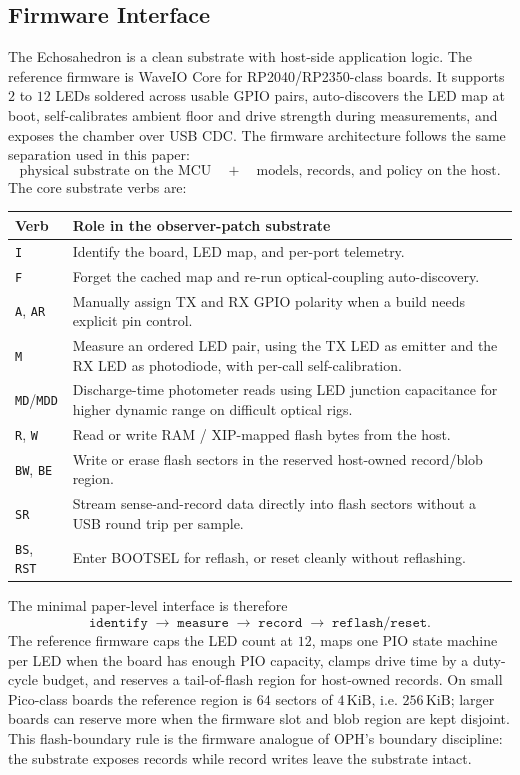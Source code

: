 \documentclass[11pt]{article}
\theoremstyle{remark}
\theoremstyle{plain}
\begin{document}
\subsection{Firmware Interface}

The Echosahedron is a clean substrate with host-side application logic. The reference firmware is WaveIO Core for RP2040/RP2350-class boards. It supports \(2\) to \(12\) LEDs soldered across usable GPIO pairs, auto-discovers the LED map at boot, self-calibrates ambient floor and drive strength during measurements, and exposes the chamber over USB CDC. The firmware architecture follows the same separation used in this paper:
\[
\boxed{
\text{physical substrate on the MCU}
\quad+\quad
\text{models, records, and policy on the host}.
}
\]
The core substrate verbs are:

\begin{longtable}{L{0.20\textwidth}L{0.70\textwidth}}
\toprule
\textbf{Verb} & \textbf{Role in the observer-patch substrate} \\
\midrule
\endhead
\texttt{I} & Identify the board, LED map, and per-port telemetry. \\
\texttt{F} & Forget the cached map and re-run optical-coupling auto-discovery. \\
\texttt{A}, \texttt{AR} & Manually assign TX and RX GPIO polarity when a build needs explicit pin control. \\
\texttt{M} & Measure an ordered LED pair, using the TX LED as emitter and the RX LED as photodiode, with per-call self-calibration. \\
\texttt{MD}/\texttt{MDD} & Discharge-time photometer reads using LED junction capacitance for higher dynamic range on difficult optical rigs. \\
\texttt{R}, \texttt{W} & Read or write RAM / XIP-mapped flash bytes from the host. \\
\texttt{BW}, \texttt{BE} & Write or erase flash sectors in the reserved host-owned record/blob region. \\
\texttt{SR} & Stream sense-and-record data directly into flash sectors without a USB round trip per sample. \\
\texttt{BS}, \texttt{RST} & Enter BOOTSEL for reflash, or reset cleanly without reflashing. \\
\bottomrule
\end{longtable}

The minimal paper-level interface is therefore
\[
\boxed{
\texttt{identify}
\;\to\;
\texttt{measure}
\;\to\;
\texttt{record}
\;\to\;
\texttt{reflash/reset}.
}
\]
The reference firmware caps the LED count at \(12\), maps one PIO state machine per LED when the board has enough PIO capacity, clamps drive time by a duty-cycle budget, and reserves a tail-of-flash region for host-owned records. On small Pico-class boards the reference region is \(64\) sectors of \(4\,\mathrm{KiB}\), i.e. \(256\,\mathrm{KiB}\); larger boards can reserve more when the firmware slot and blob region are kept disjoint. This flash-boundary rule is the firmware analogue of OPH's boundary discipline: the substrate exposes records while record writes leave the substrate intact.
\end{document}
